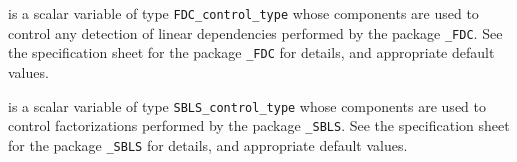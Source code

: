 \documentclass{galahad}
\begin{document}
\begin{description}
 is a scalar variable of type 
{\tt FDC\_control\_type}
whose components are used to control any detection of linear dependencies
performed by the package 
{\tt \libraryname\_FDC}. 
See the specification sheet for the package 
{\tt \libraryname\_FDC} 
for details, and appropriate default values.

 is a scalar variable of type 
{\tt SBLS\_control\_type}
whose components are used to control factorizations
performed by the package 
{\tt \libraryname\_SBLS}. 
See the specification sheet for the package 
{\tt \libraryname\_SBLS} 
for details, and appropriate default values.

\end{description}

\end{document}
